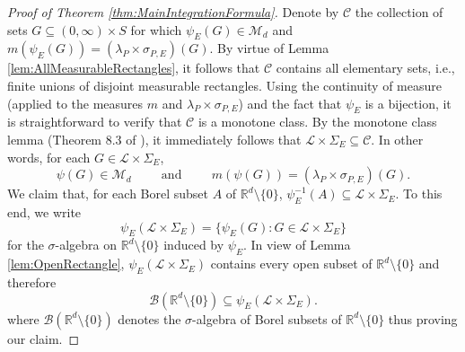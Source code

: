 \documentclass[11pt]{article}
\begin{document}

\begin{proof}[Proof of Theorem \ref{thm:MainIntegrationFormula}]
Denote by $\mathcal{C}$ the collection of sets $G\subseteq (0,\infty)\times S$ for which $\psi_E(G)\in \mathcal{M}_d$ and $m(\psi_E(G))=(\lambda_P\times\sigma_{P,E})(G).$ By virtue of Lemma \ref{lem:AllMeasurableRectangles}, it follows that $\mathcal{C}$ contains all elementary sets, i.e., finite unions of disjoint measurable rectangles. Using the continuity of measure (applied to the measures $m$ and $\lambda_P\times\sigma_{P,E}$) and the fact that $\psi_E$ is a bijection, it is straightforward to verify that $\mathcal{C}$ is a monotone class. By the monotone class lemma (Theorem 8.3 of \cite{Rudin1987}), it immediately follows that $\mathcal{L}\times\Sigma_E\subseteq\mathcal{C}$. In other words, for each $G\in\mathcal{L}\times\Sigma_E$,
\begin{equation}\label{eq:Good1}
\psi(G)\in\mathcal{M}_d\hspace{1cm}\mbox{and}\hspace{1cm}m(\psi(G))=(\lambda_P\times\sigma_{P,E})(G).
\end{equation}
We claim that, for each Borel subset $A$ of $\mathbb{R}^d\setminus\{0\}$, $\psi_E^{-1}(A)\subseteq \mathcal{L}\times\Sigma_E$. To this end, we write
\begin{equation*}
\psi_E(\mathcal{L}\times\Sigma_E)=\{\psi_E(G):G\in\mathcal{L}\times\Sigma_E\}
\end{equation*}
for the $\sigma$-algebra on $\mathbb{R}^d\setminus\{0\}$ induced by $\psi_E$. In view of Lemma \ref{lem:OpenRectangle}, $\psi_E(\mathcal{L}\times\Sigma_E)$ contains every open subset of $\mathbb{R}^d\setminus\{0\}$ and therefore
\begin{equation*}
\mathcal{B}(\mathbb{R}^d\setminus\{0\})\subseteq\psi_E(\mathcal{L}\times\Sigma_E).
\end{equation*}
where $\mathcal{B}(\mathbb{R}^d\setminus\{0\})$ denotes the $\sigma$-algebra of Borel subsets of $\mathbb{R}^d\setminus\{0\}$ thus proving our claim. 


\end{proof}
\end{document}
